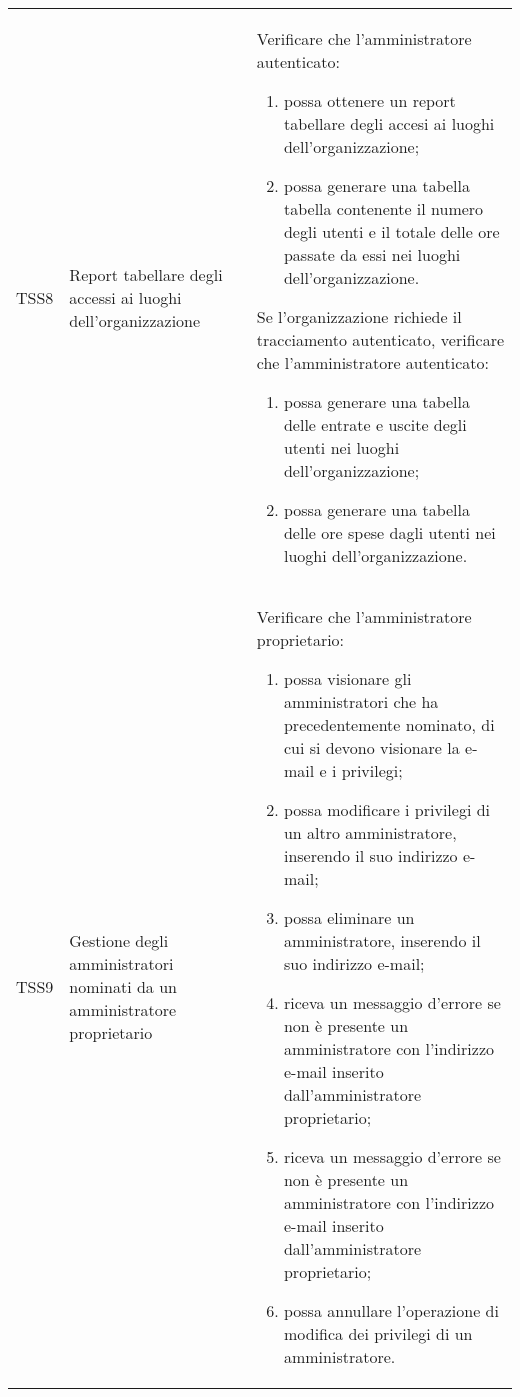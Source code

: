 {\begin{longtable}{ c | C{3cm} | C{11cm} }
TSS8 & Report tabellare degli accessi ai luoghi dell'organizzazione &
Verificare che l'amministratore autenticato:
\begin{enumerate}
    \item possa ottenere un report tabellare degli accesi ai luoghi dell'organizzazione;
    \item possa generare una tabella tabella contenente il numero degli utenti e il totale delle ore passate da essi nei luoghi dell’organizzazione.
\end{enumerate}
Se l'organizzazione richiede il tracciamento autenticato, verificare che l'amministratore autenticato:
\begin{enumerate}
    \item possa generare una tabella delle entrate e uscite degli utenti nei luoghi dell'organizzazione;
    \item possa generare una tabella delle ore spese dagli utenti nei luoghi dell'organizzazione.
\end{enumerate} \\

TSS9 & Gestione degli amministratori nominati da un amministratore proprietario & 
Verificare che l'amministratore proprietario:
\begin{enumerate}
    \item possa visionare gli amministratori che ha precedentemente nominato, di cui si devono visionare la e-mail e i privilegi;
    \item possa modificare i privilegi di un altro amministratore, inserendo il suo indirizzo e-mail;
    \item possa eliminare un amministratore, inserendo il suo indirizzo e-mail;
    \item riceva un messaggio d'errore se non è presente un amministratore con l'indirizzo e-mail inserito dall'amministratore proprietario;
    \item riceva un messaggio d'errore se non è presente un amministratore con l'indirizzo e-mail inserito dall'amministratore proprietario;
    \item possa annullare l'operazione di modifica dei privilegi di un amministratore.
\end{enumerate} \\


\end{longtable}}

